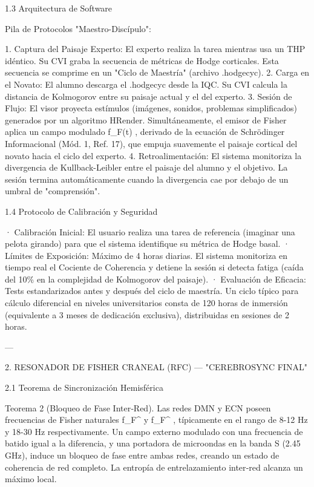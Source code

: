 \documentclass[12pt,twoside]{book}
\begin{document}
1.3 Arquitectura de Software

Pila de Protocolos "Maestro-Discípulo":

1. Captura del Paisaje Experto: El experto realiza la tarea mientras usa un THP idéntico. Su CVI graba la secuencia de métricas de Hodge corticales. Esta secuencia se comprime en un "Ciclo de Maestría" (archivo .hodgecyc).
2. Carga en el Novato: El alumno descarga el .hodgecyc desde la IQC. Su CVI calcula la distancia de Kolmogorov entre su paisaje actual y el del experto.
3. Sesión de Flujo: El visor proyecta estímulos (imágenes, sonidos, problemas simplificados) generados por un algoritmo HRender. Simultáneamente, el emisor de Fisher aplica un campo modulado  f_F(t) , derivado de la ecuación de Schrödinger Informacional (Mód. 1, Ref. 17), que empuja suavemente el paisaje cortical del novato hacia el ciclo del experto.
4. Retroalimentación: El sistema monitoriza la divergencia de Kullback-Leibler entre el paisaje del alumno y el objetivo. La sesión termina automáticamente cuando la divergencia cae por debajo de un umbral de "comprensión".

1.4 Protocolo de Calibración y Seguridad

· Calibración Inicial: El usuario realiza una tarea de referencia (imaginar una pelota girando) para que el sistema identifique su métrica de Hodge basal.
· Límites de Exposición: Máximo de 4 horas diarias. El sistema monitoriza en tiempo real el Cociente de Coherencia y detiene la sesión si detecta fatiga (caída del 10\% en la complejidad de Kolmogorov del paisaje).
· Evaluación de Eficacia: Tests estandarizados antes y después del ciclo de maestría. Un ciclo típico para cálculo diferencial en niveles universitarios consta de 120 horas de inmersión (equivalente a 3 meses de dedicación exclusiva), distribuidas en sesiones de 2 horas.

---

2. RESONADOR DE FISHER CRANEAL (RFC) — "CEREBROSYNC FINAL"

2.1 Teorema de Sincronización Hemisférica

Teorema 2 (Bloqueo de Fase Inter‑Red). Las redes DMN y ECN poseen frecuencias de Fisher naturales  f_F^{}  y  f_F^{} , típicamente en el rango de 8-12 Hz y 18-30 Hz respectivamente. Un campo externo modulado con una frecuencia de batido igual a la diferencia, y una portadora de microondas en la banda S (2.45 GHz), induce un bloqueo de fase entre ambas redes, creando un estado de coherencia de red completo. La entropía de entrelazamiento inter‑red alcanza un máximo local.
\end{document}

